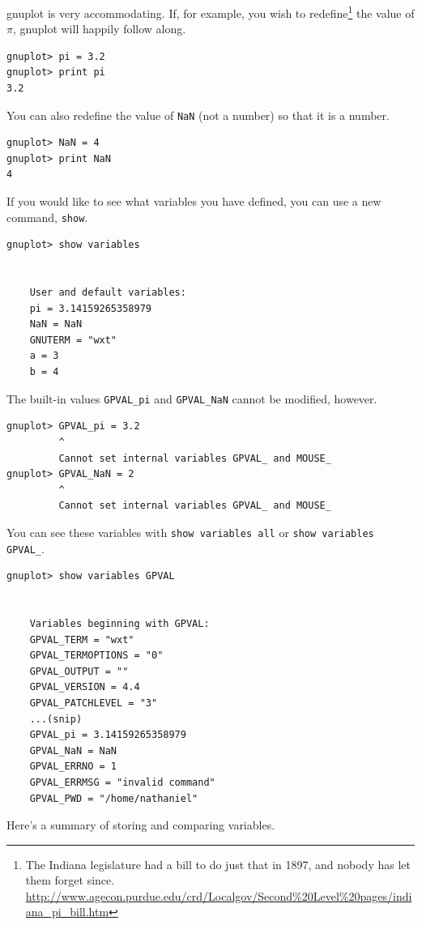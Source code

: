 \documentclass[11pt,letterpaper]{report}
\begin{document}
gnuplot is very accommodating. If, for example, you wish to redefine\footnote{The Indiana legislature had a bill to do just that in 1897, and nobody has let them forget since. \url{http://www.agecon.purdue.edu/crd/Localgov/Second\%20Level\%20pages/indiana_pi_bill.htm} }
the value of $\pi$, gnuplot will happily follow along.
\begin{lstlisting}
gnuplot> pi = 3.2
gnuplot> print pi
3.2
\end{lstlisting}

You can also redefine the value of \verb+NaN+ (not a number) so that it is a number.
\begin{lstlisting}
gnuplot> NaN = 4
gnuplot> print NaN
4
\end{lstlisting}



If you would like to see what variables you have defined, you can use a new command, \verb+show+.
\begin{lstlisting}
gnuplot> show variables


	User and default variables:
	pi = 3.14159265358979
	NaN = NaN
	GNUTERM = "wxt"
	a = 3
	b = 4

\end{lstlisting} 
The built-in values \verb+GPVAL_pi+ and   \verb+GPVAL_NaN+ cannot be modified, however.
\begin{lstlisting}
gnuplot> GPVAL_pi = 3.2
         ^
         Cannot set internal variables GPVAL_ and MOUSE_
gnuplot> GPVAL_NaN = 2
         ^
         Cannot set internal variables GPVAL_ and MOUSE_

\end{lstlisting}
You can see these variables with \verb+show variables all+ or \verb+show variables GPVAL_+.

\begin{lstlisting}
gnuplot> show variables GPVAL


	Variables beginning with GPVAL:
	GPVAL_TERM = "wxt"
	GPVAL_TERMOPTIONS = "0"
	GPVAL_OUTPUT = ""
	GPVAL_VERSION = 4.4
	GPVAL_PATCHLEVEL = "3"
	...(snip)
	GPVAL_pi = 3.14159265358979
	GPVAL_NaN = NaN
	GPVAL_ERRNO = 1
	GPVAL_ERRMSG = "invalid command"
	GPVAL_PWD = "/home/nathaniel"
\end{lstlisting}

Here's a summary of storing and comparing variables.
\end{document}
